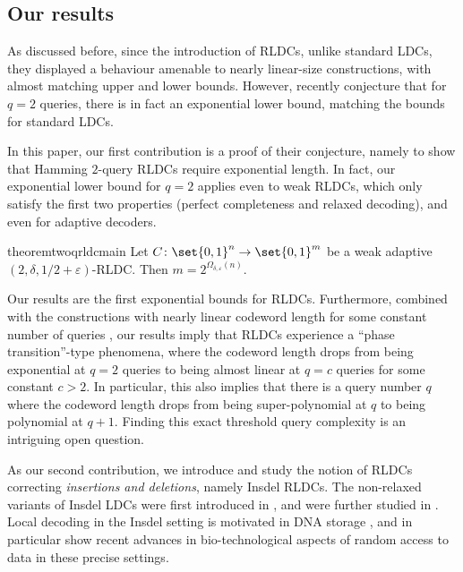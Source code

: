 \documentclass[10pt,a4paper]{article}
\theoremstyle{remark}
\newcommand{\eps}{\ensuremath{\varepsilon}}
\newcommand{\authnote}[3]{\textcolor{#2}{{\sf (#1's Note: {\sl{#3}})}}}
\newcommand{\enote}{\authnote{Elena}{green}}
\newcommand{\authnote}{}
\newcommand{\enote}[1]{}
\begin{document}
\subsection{Our results}

As discussed before, since the introduction of RLDCs, unlike standard LDCs, they displayed a behaviour amenable to nearly linear-size constructions, with almost matching upper and lower bounds. However, recently \cite{GurL21} conjecture that for $q=2$ queries, there is in fact an exponential lower bound, matching the bounds for standard LDCs. 
 
In this paper, our first contribution is a proof of their conjecture, namely to show that Hamming $2$-query RLDCs  require exponential length. In fact, our exponential lower bound for $q=2$ applies even to weak RLDCs, which only satisfy the first two properties (perfect completeness and relaxed decoding), and even for adaptive decoders. 


\begin{restatable}{theorem}{twoqrldcmain} \label{thm:main-2qRLDC}
	Let $C \colon \set{0,1}^n \rightarrow \set{0,1}^m$ be a weak adaptive $(2,\delta,1/2+\eps)$-RLDC. Then $m = 2^{\Omega_{\delta,\eps}(n)}$.
\end{restatable}
Our results are the first exponential bounds for RLDCs. Furthermore, combined with the constructions with nearly linear codeword length for some constant number of queries \cite{Ben-SassonGHSV06, AsadiS21}, our results imply that RLDCs experience a ``phase transition''-type phenomena, where the codeword length drops from being exponential at $q=2$ queries to being almost linear at $q=c$ queries for some constant $c> 2$. In particular, this also implies that there is a query number $q$ where the codeword length drops from being super-polynomial at $q$ to being polynomial at $q+1$. Finding this exact threshold query complexity is an intriguing open question.    




As our second contribution, we introduce and study the notion of RLDCs  correcting {\em insertions and deletions}, namely  Insdel RLDCs. 
The non-relaxed variants of Insdel LDCs  were first introduced in \cite{Ostrovsky-InsdelLDC-Compiler}, and were further studied in \cite{BlockBGKZ20,ChengLZ20,block2021private}. Local decoding in the Insdel setting is  motivated in DNA storage \cite{Olgica17}, and in particular  \cite{Banaletal-nature2021} show recent advances in bio-technological aspects of random access to data in these precise settings.
\end{document}
